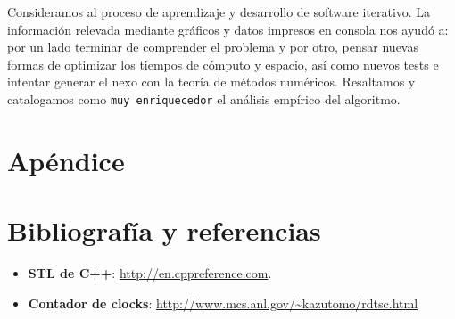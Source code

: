 	\par
	Consideramos al proceso de aprendizaje y desarrollo de software iterativo. La información relevada mediante gráficos y datos impresos en consola nos ayudó a: por un lado terminar de comprender el problema y por otro, pensar nuevas formas de optimizar los tiempos de cómputo y espacio, así como nuevos tests e intentar generar el nexo con la teoría de métodos numéricos. Resaltamos y catalogamos como \texttt{muy enriquecedor} el análisis empírico del algoritmo.

	


\section{Apéndice}

\section{Bibliografía y referencias} %

\begin{itemize}
	\item \textbf{STL de C++}: \url{http://en.cppreference.com}.
	\item \textbf{Contador de clocks}: \url{http://www.mcs.anl.gov/\~kazutomo/rdtsc.html}
\end{itemize}



